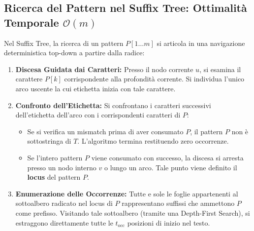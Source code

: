 \FloatBarrier
\subsection{Ricerca del Pattern nel Suffix Tree: Ottimalit\`a Temporale $\mathcal{O}(m)$}
\label{subsec:ricerca-pattern-suffix-tree}

Nel Suffix Tree, la ricerca di un pattern $P[1 \dots m]$ si articola in una navigazione deterministica top-down a partire dalla radice:
\begin{enumerate}
  \item \textbf{Discesa Guidata dai Caratteri:} Presso il nodo corrente $u$, si esamina il carattere $P[k]$ corrispondente alla profondit\`a corrente. Si individua l'unico arco uscente la cui etichetta inizia con tale carattere.
  \item \textbf{Confronto dell'Etichetta:} Si confrontano i caratteri successivi dell'etichetta dell'arco con i corrispondenti caratteri di $P$:
  \begin{itemize}
    \item Se si verifica un mismatch prima di aver consumato $P$, il pattern $P$ non \`e sottostringa di $T$. L'algoritmo termina restituendo zero occorrenze.
    \item Se l'intero pattern $P$ viene consumato con successo, la discesa si arresta presso un nodo interno $v$ o lungo un arco. Tale punto viene definito il \textbf{locus} del pattern $P$.
  \end{itemize}
  \item \textbf{Enumerazione delle Occorrenze:} Tutte e sole le foglie appartenenti al sottoalbero radicato nel locus di $P$ rappresentano suffissi che ammettono $P$ come prefisso. Visitando tale sottoalbero (tramite una Depth-First Search), si estraggono direttamente tutte le $t_{\text{occ}}$ posizioni di inizio nel testo.
\end{enumerate}

